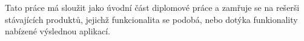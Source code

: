 \begin{introduction}
Tato práce má sloužit jako úvodní část diplomové práce a zamřuje se na rešerši stávajících produktů, jejichž funkcionalita se podobá, nebo dotýka funkionality nabízené výslednou aplikací.
\end{introduction}